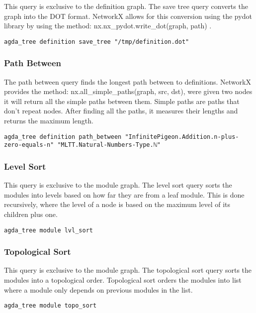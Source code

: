 This query is exclusive to the definition graph. The save tree query converts
the graph into the DOT format. NetworkX allows for this conversion using the
pydot library by using the method: \textsf{nx.nx\_pydot.write\_dot(graph, path) }.

\begin{lstlisting}
agda_tree definition save_tree "/tmp/definition.dot"
\end{lstlisting}

\subsubsection{Path Between}

The path between query finds the longest path between to definitions. NetworkX
provides the method: \textsf{nx.all\_simple\_paths(graph, src, dst)}, were given
two nodes it will return all the simple paths between them. Simple paths are
paths that don't repeat nodes. After finding all the paths, it measures their
lengths and returns the maximum length.

\begin{lstlisting}
agda_tree definition path_between "InfinitePigeon.Addition.n-plus-zero-equals-n" "MLTT.Natural-Numbers-Type.ℕ"
\end{lstlisting}

\subsubsection{Level Sort}

This query is exclusive to the module graph. The level sort query sorts the
modules into levels based on how far they are from a leaf module. This is done
recursively, where the level of a node is based on the maximum level of its
children plus one.

\begin{lstlisting}
agda_tree module lvl_sort
\end{lstlisting}

\subsubsection{Topological Sort}

This query is exclusive to the module graph. The topological sort query sorts
the modules into a topological order. Topological sort orders the modules into
list where a module only depends on previous modules in the list.


\begin{lstlisting}
agda_tree module topo_sort
\end{lstlisting}

